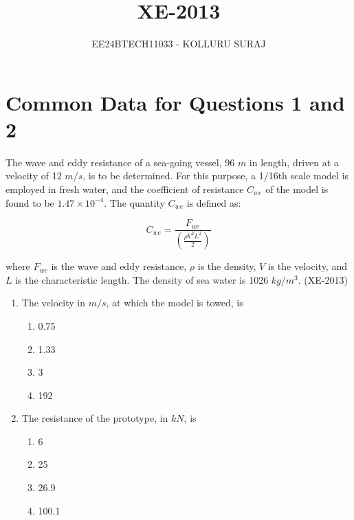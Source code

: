 \documentclass[journal]{IEEEtran}
\numberwithin{equation}{enumi}
\numberwithin{figure}{enumi}
\begin{document}

\title{XE-2013}
\author{EE24BTECH11033 - KOLLURU SURAJ}
{\let\newpage\relax\maketitle}

\section*{Common Data for Questions 1 and 2} \label{sec:common_data_1_2}
The wave and eddy resistance of a sea-going vessel, 96 $m$ in length, driven at a velocity of 12 $m/s$, is to be determined. For this purpose, a 1/16th scale model is employed in fresh water, and the coefficient of resistance $C_{we}$ of the model is found to be $1.47 \times 10^{-4}$. The quantity $C_{we}$ is defined as:

\[
C_{we} = \frac{F_{we}}{\left(\frac{\rho V^2 L^2}{2}\right)}
\]

where $F_{we}$ is the wave and eddy resistance, $\rho$ is the density, $V$ is the velocity, and $L$ is the characteristic length. The density of sea water is 1026 $kg/m^3$. \hfill(XE-2013)

\begin{enumerate}
    \item The velocity in $m/s$, at which the model is towed, is
    \begin{multicols}{4}
        \begin{enumerate}
            \item 0.75
            \item 1.33
            \item 3
            \item 192
        \end{enumerate}
    \end{multicols}

    \item The resistance of the prototype, in $kN$, is
    \begin{multicols}{4}
        \begin{enumerate}[label=(\Alph*)]
            \item 6
            \item 25
            \item 26.9
            \item 100.1
        \end{enumerate}
    \end{multicols}
\end{enumerate}
\end{document}
